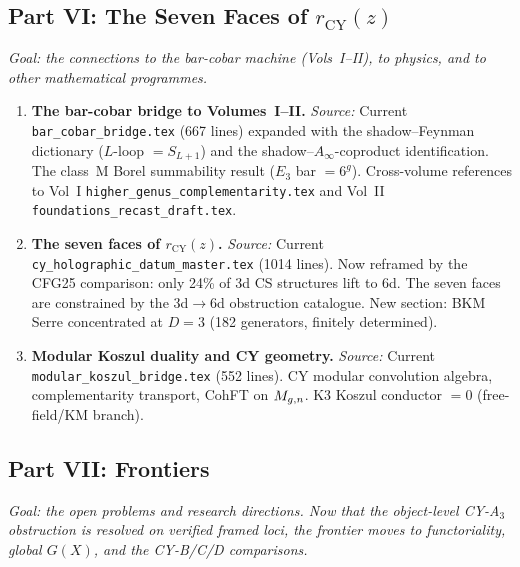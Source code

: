 \documentclass[11pt]{article}
\newcommand{\CY}{\mathrm{CY}}
\newcommand{\Ainf}{A_\infty}
\begin{document}
\subsection{Part VI: The Seven Faces of $r_{\CY}(z)$}
\label{sec:part-vi}

\textit{Goal: the connections to the bar-cobar machine (Vols~I--II),
to physics, and to other mathematical programmes.}

\begin{enumerate}[label=\textbf{Ch.\,\arabic*.},leftmargin=3.5em,start=26]
\item \textbf{The bar-cobar bridge to Volumes~I--II.}
 \textit{Source:} Current \texttt{bar\_cobar\_bridge.tex} (667 lines)
 expanded with the shadow--Feynman dictionary ($L$-loop $= S_{L+1}$)
 and the shadow--$\Ainf$-coproduct identification. The class~M Borel
 summability result ($E_3$ bar $= 6^g$). Cross-volume references
 to Vol~I \texttt{higher\_genus\_complementarity.tex} and Vol~II
 \texttt{foundations\_recast\_draft.tex}.

\item \textbf{The seven faces of $r_{\CY}(z)$.}
 \textit{Source:} Current \texttt{cy\_holographic\_datum\_master.tex}
 (1014 lines). Now reframed by the CFG25 comparison: only 24\% of 3d
 CS structures lift to 6d. The seven faces are constrained by the
 3d$\to$6d obstruction catalogue. New section: BKM Serre concentrated
 at $D=3$ (182 generators, finitely determined).

\item \textbf{Modular Koszul duality and CY geometry.}
 \textit{Source:} Current \texttt{modular\_koszul\_bridge.tex}
 (552 lines). CY modular convolution algebra, complementarity
 transport, CohFT on $M_{g,n}$. K3 Koszul conductor $= 0$
 (free-field/KM branch).
\end{enumerate}

\subsection{Part VII: Frontiers}
\label{sec:part-vii}

\textit{Goal: the open problems and research directions. Now that the
object-level CY-A$_3$ obstruction is resolved on verified framed loci,
the frontier moves to functoriality, global $G(X)$, and the CY-B/C/D
comparisons.}
\end{document}
